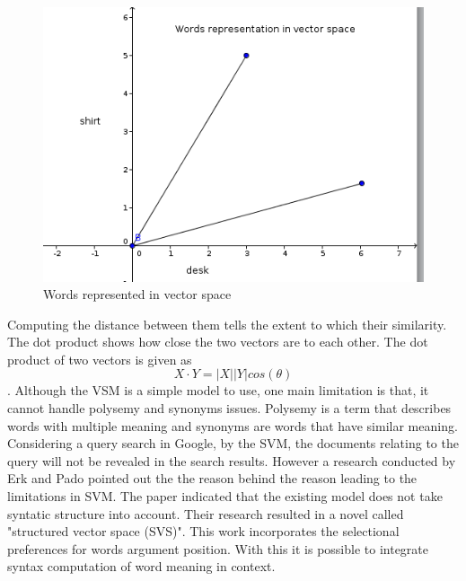 \begin{figure}[hbtp]
\centering
\includegraphics[scale=1]{words_in_vs.png}
\caption{Words represented in vector space}
\end{figure}
\label{figure 2.1}
Computing the distance between them tells the extent to which their similarity. The dot product shows how close the two vectors are to each other. The dot product of two vectors is given as
$$X\cdot Y=|X||Y|cos (\theta)$$.
Although the VSM is a simple model to use, one main limitation is that, it cannot handle polysemy and synonyms issues. Polysemy is a term that describes words with multiple meaning and synonyms are words that have similar meaning.
Considering a query search in Google, by the SVM, the documents relating to the query will not be revealed in the search results. However a research conducted by Erk and Pado pointed out the the reason behind the reason leading to the limitations in SVM.
The paper indicated that the existing model does not take syntatic structure into account. Their research resulted in a novel called "structured vector space (SVS)".
 This work incorporates the selectional preferences for words argument position. With this it is possible to integrate syntax computation of word meaning in context. 

